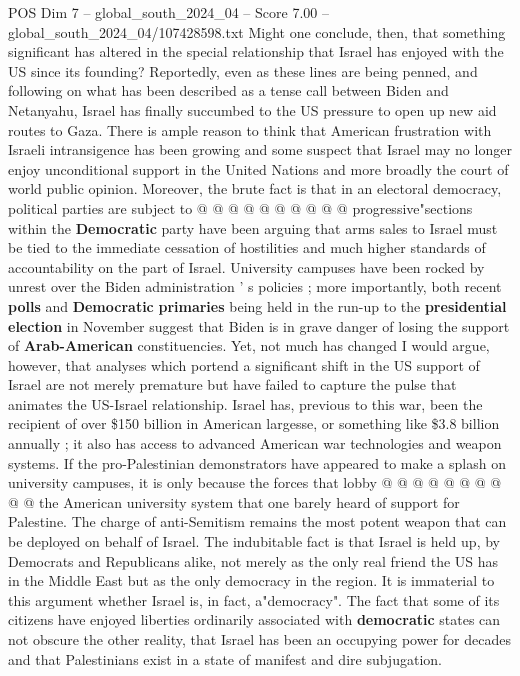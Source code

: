 \begin{textsample}{POS Dim 7 – global\_south\_2024\_04 – Score 7.00 – global\_south\_2024\_04/107428598.txt}
Might one conclude, then, that something significant has altered in the special relationship that Israel has enjoyed with the US since its founding?
Reportedly, even as these lines are being penned, and following on what has been described as a tense call between Biden and Netanyahu, Israel has finally succumbed to the US pressure to open up new aid routes to Gaza.
There is ample reason to think that American frustration with Israeli intransigence has been growing and some suspect that Israel may no longer enjoy unconditional support in the United Nations and more broadly the court of world public opinion.
Moreover, the brute fact is that in an electoral democracy, political parties are subject to @ @ @ @ @ @ @ @ @ @ progressive"sections within the \textbf{Democratic} party have been arguing that arms sales to Israel must be tied to the immediate cessation of hostilities and much higher standards of accountability on the part of Israel.
University campuses have been rocked by unrest over the Biden administration ' s policies ; more importantly, both recent \textbf{polls} and \textbf{Democratic} \textbf{primaries} being held in the run-up to the \textbf{presidential} \textbf{election} in November suggest that Biden is in grave danger of losing the support of \textbf{Arab-American} constituencies.
Yet, not much has changed I would argue, however, that analyses which portend a significant shift in the US support of Israel are not merely premature but have failed to capture the pulse that animates the US-Israel relationship.
Israel has, previous to this war, been the recipient of over \$150 billion in American largesse, or something like \$3.8 billion annually ; it also has access to advanced American war technologies and weapon systems.
If the pro-Palestinian demonstrators have appeared to make a splash on university campuses, it is only because the forces that lobby @ @ @ @ @ @ @ @ @ @ the American university system that one barely heard of support for Palestine.
The charge of anti-Semitism remains the most potent weapon that can be deployed on behalf of Israel.
The indubitable fact is that Israel is held up, by Democrats and Republicans alike, not merely as the only real friend the US has in the Middle East but as the only democracy in the region.
It is immaterial to this argument whether Israel is, in fact, a"democracy".
The fact that some of its citizens have enjoyed liberties ordinarily associated with \textbf{democratic} states can not obscure the other reality, that Israel has been an occupying power for decades and that Palestinians exist in a state of manifest and dire subjugation.

\end{textsample}
